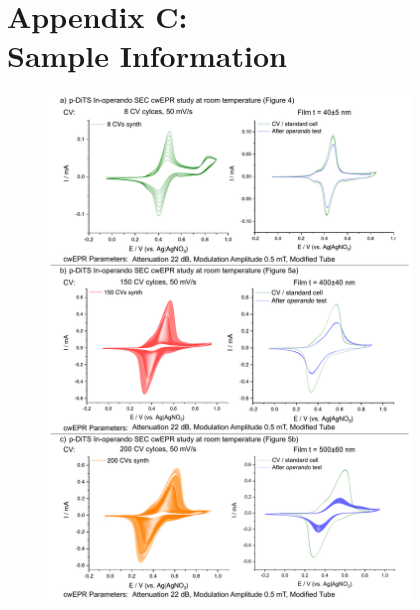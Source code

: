 \chapter*{Appendix C:\\Sample Information}

\label{Sample_info}
\begin{figure}[]
\centering
\includegraphics[width=0.86\textwidth]{./electrochemistry/figures/Figure_S3a}

\end{figure}
\newpage

